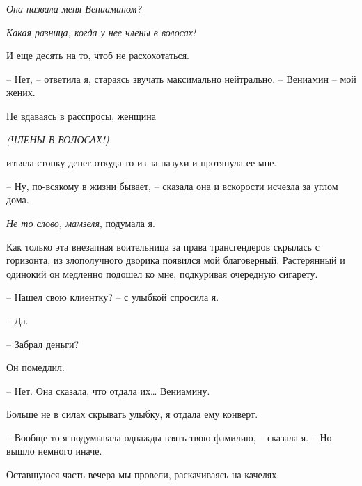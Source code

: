 \documentclass[
]{book}
\begin{document}
\emph{Она назвала меня Вениамином?}

\emph{Какая разница, когда у нее члены в волосах! }

И еще десять на то, чтоб не расхохотаться.

-- Нет, -- ответила я, стараясь звучать максимально нейтрально. -- Вениамин -- мой жених.

Не вдаваясь в расспросы, женщина

\emph{(ЧЛЕНЫ В ВОЛОСАХ!)}

изъяла стопку денег откуда-то из-за пазухи и протянула ее мне.

-- Ну, по-всякому в жизни бывает, -- сказала она и вскорости исчезла за углом дома.

\emph{Не то слово, мамзеля}, подумала я.

Как только эта внезапная воительница за права трансгендеров скрылась с горизонта, из злополучного дворика появился мой благоверный. Растерянный и одинокий он медленно подошел ко мне, подкуривая очередную сигарету.

-- Нашел свою клиентку? -- с улыбкой спросила я.

-- Да.

-- Забрал деньги?

Он помедлил.

-- Нет. Она сказала, что отдала их\ldots{} Вениамину.

Больше не в силах скрывать улыбку, я отдала ему конверт.

-- Вообще-то я подумывала однажды взять твою фамилию, -- сказала я. -- Но вышло немного иначе.

Оставшуюся часть вечера мы провели, раскачиваясь на качелях.
\end{document}
